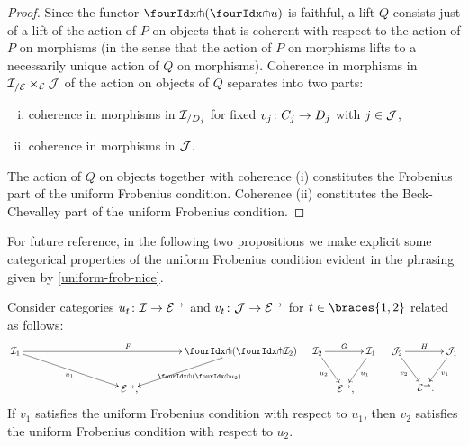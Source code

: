 \documentclass[reqno,10pt,a4paper,oneside,draft]{amsart}
\begin{document}
\begin{proof}
Since the functor $\liftl{(\liftr{u})}$ is faithful, a lift $Q$ consists just of a lift of the action of $P$ on objects that is coherent with respect to the action of $P$ on morphisms (in the sense that the action of $P$ on morphisms lifts to a necessarily unique action of $Q$ on morphisms).
Coherence in morphisms in $\cal{I}_{/\cal{E}} \times_{\cal{E}} \cal{J}$ of the action on objects of $Q$ separates into two parts:
\begin{enumerate}[(i)]
\item coherence in morphisms in $\cal{I}_{/D_j}$ for fixed $v_j \co C_j \to D_j$ with $j \in \cal{J}$,
\item coherence in morphisms in $\cal{J}$.
\end{enumerate}
The action of $Q$ on objects together with coherence (i) constitutes the Frobenius part of the uniform Frobenius condition.
Coherence (ii) constitutes the Beck-Chevalley part of the uniform Frobenius condition.
\end{proof}

For future reference, in the following two propositions we make explicit some categorical properties of the uniform Frobenius condition evident in the phrasing given by \cref{uniform-frob-nice}.

\begin{proposition} \label{uniform-frobenius-functorial}
Consider categories $u_t \co \cal{I} \to \cal{E}^\to$ and $v_t \co \cal{J} \to \cal{E}^\to$ for $t \in \braces{1, 2}$ related as follows:
\begin{align*}
\xymatrix@!C@C-3em{
  \cal{I}_1
  \ar[rr]^{F}
  \ar[dr]_{u_1}
&&
  \liftl{(\liftr{\cal{I}_2})}
  \ar[dl]^{\liftl{(\liftr{u_2})}}
\\&
  \catE^\to
\rlap{,}}
&&
\xymatrix@C-1.5em{
  \cal{I}_2
  \ar[rr]^-{G}
  \ar[dr]_{u_2}
&&
  \cal{I}_1
  \ar[dl]^{u_1}
\\&
  \catE^\to
\rlap{,}}
&&
\xymatrix@C-1.5em{
  \cal{J}_2
  \ar[rr]^-{H}
  \ar[dr]_{v_2}
&&
  \cal{J}_1
  \ar[dl]^{v_1}
\\&
  \catE^\to
\rlap{.}}
\end{align*}
If $v_1$ satisfies the uniform Frobenius condition with respect to $u_1$, then $v_2$ satisfies the uniform Frobenius condition with respect to $u_2$.
\end{proposition}
\end{document}
